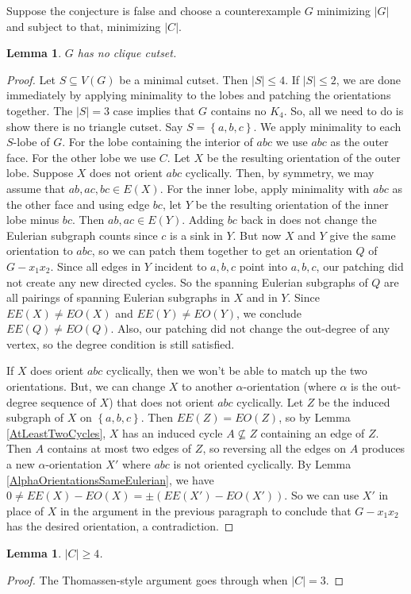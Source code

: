 \documentclass[12pt]{article}
\theoremstyle{plain}
\newtheorem{lem}[thm]{Lemma}
\theoremstyle{definition}
\theoremstyle{remark}
\newcommand{\set}[1]{\left\{ #1 \right\}}
\newcommand{\parens}[1]{\left( #1 \right)}
\begin{document}
Suppose the conjecture is false and choose a counterexample $G$ minimizing $|G|$ and subject to that, minimizing $|C|$.

\begin{lem}
	$G$ has no clique cutset.
\end{lem}
\begin{proof}
	Let $S \subseteq V(G)$ be a minimal cutset.  Then $|S| \le 4$.  If $|S| \le 2$, we are done immediately by applying minimality to the lobes and patching the orientations together.  The $|S| = 3$ case implies that $G$ contains no $K_4$.  So, all we need to do
	is show there is no triangle cutset.  Say $S = \set{a,b,c}$.  We apply minimality to each $S$-lobe of $G$.  For the lobe containing the interior of $abc$ we use $abc$ as the outer face.  For the other lobe we use $C$.  Let $X$ be the resulting orientation of the outer lobe.  Suppose $X$ does not orient $abc$ cyclically.  Then, by symmetry, we may assume that $ab, ac, bc \in E(X)$.  For the inner lobe, apply minimality with $abc$ as the other face and using edge $bc$, let $Y$ be the resulting orientation of the inner lobe minus $bc$.  Then $ab,ac \in E(Y)$.  Adding $bc$ back in does not change the Eulerian subgraph counts since $c$ is a sink in $Y$.  But now $X$ and $Y$ give the same orientation to $abc$, so we can patch them together to get an orientation $Q$ of $G-x_1x_2$.  Since all edges in $Y$ incident to $a,b,c$ point into $a,b,c$, our patching did not create any new directed cycles.  So the spanning Eulerian subgraphs of $Q$ are all pairings of spanning Eulerian subgraphs in $X$ and in $Y$.  Since $EE(X) \ne EO(X)$ and $EE(Y) \ne EO(Y)$, we conclude $EE(Q) \ne EO(Q)$.  Also, our patching did not change the out-degree of any vertex, so the degree condition is still satisfied.
	
	If $X$ does orient $abc$ cyclically, then we won't be able to match up the two orientations.  But, we can change $X$ to another $\alpha$-orientation (where $\alpha$ is the out-degree sequence of $X$) that does not orient $abc$ cyclically.
	Let $Z$ be the induced subgraph of $X$ on $\set{a,b,c}$.  Then $EE(Z) = EO(Z)$, so by Lemma \ref{AtLeastTwoCycles}, $X$ has an induced cycle $A \not \subseteq Z$ containing an edge of $Z$.  Then $A$ contains at most two edges of $Z$, so reversing all the edges on $A$ produces a new $\alpha$-orientation $X'$ where $abc$ is not oriented cyclically.  By Lemma \ref{AlphaOrientationsSameEulerian}, we have $0 \ne EE(X) - EO(X) = \pm\parens{EE(X') - EO(X')}$.  So we can use $X'$ in place of $X$ in the argument in the previous paragraph to conclude that $G-x_1x_2$ has the desired orientation, a contradiction.
\end{proof}

\begin{lem}
	$|C| \ge 4$.
\end{lem}
\begin{proof}
	The Thomassen-style argument goes through when $|C| = 3$.
\end{proof}



\end{document}
